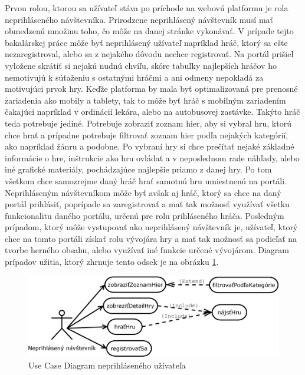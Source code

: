 Prvou rolou, ktorou sa užívateľ stáva po príchode na webovú platformu je rola neprihláseného návštevníka. Prirodzene neprihlásený návštevník musí mať obmedzenú množinu toho, čo môže na danej stránke vykonávať. V prípade tejto bakalárskej práce môže byť neprihlásený užívateľ napríklad hráč, ktorý sa ešte nezaregistroval, alebo sa z nejakého dôvodu nechce registrovať. Na portál prišiel vyložene skrátiť si nejakú nudnú chvíľu, skóre tabuľky najlepších hráčov ho nemotivujú k súťaženiu s ostatnými hráčmi a ani odmeny nepokladá za motivujúci prvok hry. Keďže platforma by mala byť optimalizovaná pre prenosné zariadenia ako mobily a tablety, tak to môže byť hráč s mobilným zariadením čakajúci napríklad v ordinácií lekára, alebo na autobusovej zastávke. Takýto hráč teda potrebuje jediné. Potrebuje zobraziť zoznam hier, aby si vybral hru, ktorú chce hrať a prípadne potrebuje filtrovať zoznam hier podľa nejakých kategórií, ako napríklad žánru a podobne. Po vybraní hry si chce prečítať nejaké základné informácie o hre, inštrukcie ako hru ovládať a v neposlednom rade náhľady, alebo iné grafické materiály, pochádzajúce najlepšie priamo z danej hry. Po tom všetkom chce samozrejme daný hráč hrať samotnú hru umiestnenú na portáli. Neprihláseným návštevníkom môže byť avšak aj hráč, ktorý sa chce na daný portál prihlásiť, poprípade sa zaregistrovať a mať tak možnosť využívať všetku funkcionalitu daného portálu, určenú pre rolu prihláseného hráča. Posledným prípadom, ktorý môže vystupovať  ako neprihlásený návštevník je, užívateľ, ktorý chce na tomto portáli získať rolu vývojára hry a mať tak možnosť sa podieľať na tvorbe herného obsahu, alebo využívať iné funkcie určené vývojárom. Diagram prípadov užitia, ktorý zhrnuje tento odsek je na obrázku \ref{fig:ucdneprihlaseny}.
\begin{figure}[h]
  \centering
  \includegraphics[scale=0.43]{fig/ucd-neprihlaseny.eps}
  \caption{Use Case Diagram neprihláseného užívateľa}
  \label{fig:ucdneprihlaseny}
\end{figure}

